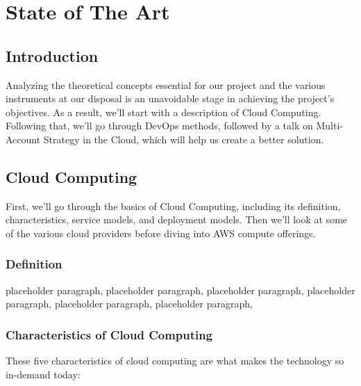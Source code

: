 \chapter{State of The Art}
\label{chap_2}
\section*{Introduction}
\qquad  Analyzing the theoretical concepts essential for our project and the various instruments at our disposal is an unavoidable stage in achieving the project's objectives. As a result, we'll start with a description of Cloud Computing. Following that, we'll go through DevOps methods, followed by a talk on Multi-Account Strategy in the Cloud, which will help us create a better solution.

\newpage

\section{Cloud Computing}
\qquad First, we'll go through the basics of Cloud Computing, including its definition, characteristics, service models, and deployment models. Then we'll look at some of the various cloud providers before diving into AWS compute offerings.

\subsection{Definition}
\qquad 
placeholder paragraph, placeholder paragraph, placeholder paragraph, placeholder paragraph, placeholder paragraph, placeholder paragraph,
\subsection{Characteristics of Cloud Computing}
\qquad 
These five characteristics of cloud computing are what makes the technology so in-demand today: 

